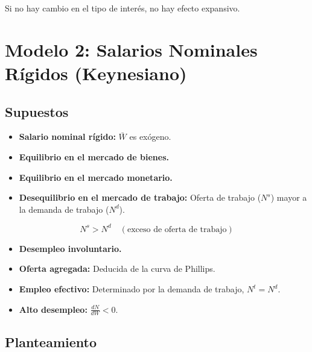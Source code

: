 \documentclass[
  doc,
  floatsintext,
  longtable,
  a4paper,
  nolmodern,
  notxfonts,
  notimes,
  colorlinks=true,linkcolor=blue,citecolor=blue,urlcolor=blue]{apa7}
\providecommand{\tightlist}{%
  \setlength{\itemsep}{0pt}\setlength{\parskip}{0pt}}
\begin{document}


Si no hay cambio en el tipo de interés, no hay efecto expansivo.

\section{Modelo 2: Salarios Nominales Rígidos
(Keynesiano)}\label{modelo-2-salarios-nominales-ruxedgidos-keynesiano}

\subsection{Supuestos}\label{supuestos-1}

\begin{itemize}
\tightlist
\item
  \textbf{Salario nominal rígido:} \(\bar{W}\) es exógeno.
\item
  \textbf{Equilibrio en el mercado de bienes.}
\item
  \textbf{Equilibrio en el mercado monetario.}
\item
  \textbf{Desequilibrio en el mercado de trabajo:} Oferta de trabajo
  (\(N^s\)) mayor a la demanda de trabajo (\(N^d\)).
\end{itemize}

\[
N^s > N^d \quad (\text{exceso de oferta de trabajo})
\]

\begin{itemize}
\tightlist
\item
  \textbf{Desempleo involuntario.}
\item
  \textbf{Oferta agregada:} Deducida de la curva de Phillips.
\item
  \textbf{Empleo efectivo:} Determinado por la demanda de trabajo,
  \(N^t = N^d\).
\item
  \textbf{Alto desempleo:} \(\frac{dN}{dW} < 0\).
\end{itemize}

\subsection{Planteamiento}\label{planteamiento-1}
\end{document}
